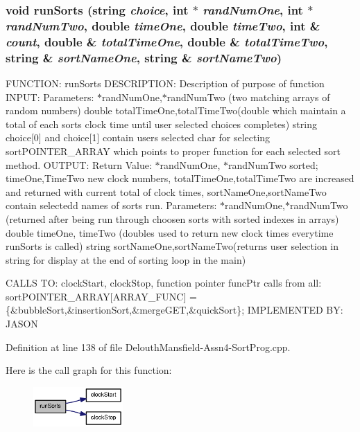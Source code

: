 \hypertarget{_delouth_mansfield-_assn4-_sort_prog_8cpp_acd0f7b42076b153145b2198ffad4a0c2}{
\subsubsection[{runSorts}]{\setlength{\rightskip}{0pt plus 5cm}void runSorts (string {\em choice}, \/  int $\ast$ {\em randNumOne}, \/  int $\ast$ {\em randNumTwo}, \/  double {\em timeOne}, \/  double {\em timeTwo}, \/  int \& {\em count}, \/  double \& {\em totalTimeOne}, \/  double \& {\em totalTimeTwo}, \/  string \& {\em sortNameOne}, \/  string \& {\em sortNameTwo})}}
\label{_delouth_mansfield-_assn4-_sort_prog_8cpp_acd0f7b42076b153145b2198ffad4a0c2}
FUNCTION: runSorts DESCRIPTION: Description of purpose of function INPUT: Parameters: $\ast$randNumOne,$\ast$randNumTwo (two matching arrays of random numbers) double totalTimeOne,totalTimeTwo(double which maintain a total of each sorts clock time until user selected choices completes) string choice\mbox{[}0\mbox{]} and choice\mbox{[}1\mbox{]} contain users selected char for selecting sortPOINTER\_\-ARRAY which points to proper function for each selected sort method. OUTPUT: Return Value: $\ast$randNumOne, $\ast$randNumTwo sorted; timeOne,TimeTwo new clock numbers, totalTimeOne,totalTimeTwo are increased and returned with current total of clock times, sortNameOne,sortNameTwo contain selectedd names of sorts run. Parameters: $\ast$randNumOne,$\ast$randNumTwo (returned after being run through choosen sorts with sorted indexes in arrays) double timeOne, timeTwo (doubles used to return new clock times everytime runSorts is called) string sortNameOne,sortNameTwo(returns user selection in string for display at the end of sorting loop in the main)

CALLS TO: clockStart, clockStop, function pointer funcPtr calls from all: sortPOINTER\_\-ARRAY\mbox{[}ARRAY\_\-FUNC\mbox{]} = \{\&bubbleSort,\&insertionSort,\&mergeGET,\&quickSort\}; IMPLEMENTED BY: JASON 

Definition at line 138 of file DelouthMansfield-\/Assn4-\/SortProg.cpp.



Here is the call graph for this function:\nopagebreak
\begin{figure}[H]
\begin{center}
\leavevmode
\includegraphics[width=97pt]{_delouth_mansfield-_assn4-_sort_prog_8cpp_acd0f7b42076b153145b2198ffad4a0c2_cgraph}
\end{center}
\end{figure}




